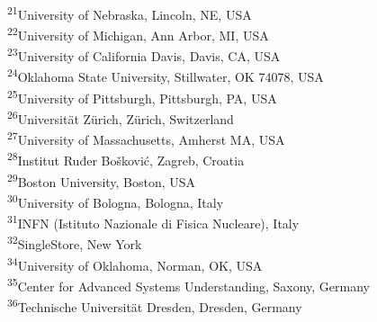 \documentclass[twocolumn]{svjour3}          %
\newcommand*{\affaddr}[1]{#1} %
\newcommand*{\affmark}[1][*]{\textsuperscript{#1}}
\begin{document}
{\affaddr{\affmark[21]University of Nebraska, Lincoln, NE, USA }\\
\affaddr{\affmark[22]University of Michigan, Ann Arbor, MI, USA }\\
\affaddr{\affmark[23]University of California Davis, Davis, CA, USA }\\
\affaddr{\affmark[24]Oklahoma State University, Stillwater, OK 74078, USA }\\
\affaddr{\affmark[25]University of Pittsburgh, Pittsburgh, PA, USA }\\
\affaddr{\affmark[26]Universität Zürich, Zürich, Switzerland }\\
\affaddr{\affmark[27]University of Massachusetts, Amherst MA, USA }\\
\affaddr{\affmark[28]Institut Ruđer Bo\v skovi\' c, Zagreb, Croatia }\\
\affaddr{\affmark[29]Boston University, Boston, USA }\\
\affaddr{\affmark[30]University of Bologna, Bologna, Italy }\\
\affaddr{\affmark[31]INFN (Istituto Nazionale di Fisica Nucleare), Italy }\\
\affaddr{\affmark[32]SingleStore, New York}\\
\affaddr{\affmark[34]University of Oklahoma, Norman, OK, USA } \\
\affaddr{\affmark[35]Center for Advanced Systems Understanding, Saxony, Germany}\\
\affaddr{\affmark[36]Technische Universität Dresden, Dresden, Germany }\\
}





%        
%        

\end{document}
